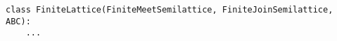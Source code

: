 \par\begin{minipage}{71ex}
\begin{verbatim}
class FiniteLattice(FiniteMeetSemilattice, FiniteJoinSemilattice, ABC):
    ...
\end{verbatim}
\end{minipage}\par